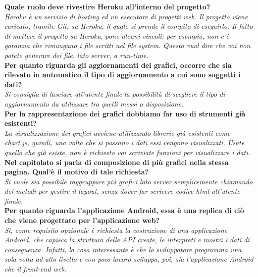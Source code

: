 	\textbf{Quale ruolo deve rivestire Heroku all'interno del progetto?}\\
	\textit{Heroku è un servizio di hosting ed un esecutore di progetti web. Il progetto viene caricato, tramite Git, su Heroku, il quale si prende il compito di eseguirlo. Il fatto di mettere il progetto su Heroku, pone alcuni vincoli: per esempio, non c'è garanzia che rimangano i file scritti nel file system. Questo vuol dire che voi non potete generare dei file, lato server, a run-time.}\\
	
	\textbf{Per quanto riguarda gli aggiornamenti dei grafici, occorre che sia rilevato in automatico il tipo di aggiornamento a cui sono soggetti i dati?}\\
	\textit{Si consiglia di lasciare all'utente finale la possibilità di scegliere il tipo di aggiornamento da utilizzare tra quelli messi a disposizione.}\\
	
	\textbf{Per la rappresentazione dei grafici dobbiamo far uso di strumenti già esistenti?}\\
	\textit{La visualizzazione dei grafici avviene utilizzando librerie già esistenti come chart.js, quindi, una volta che si passano i dati essi vengono visualizzati. Usate quello che già esiste, non è richiesto voi scriviate funzioni per visualizzare i dati.}\\
	
	\textbf{Nel capitolato si parla di composizione di più grafici nella stessa pagina. Qual'è il motivo di tale richiesta?}\\
	\textit{Si vuole sia possibile raggruppare più grafici lato server semplicemente chiamando dei metodi per gestire il layout, senza dover far scrivere codice html all'utente finale.}\\
	
	\textbf{Per quanto riguarda l'applicazione Android, essa è una replica di ciò che viene progettato per l'applicazione web?}\\
	\textit{Si, come requisito opzionale è richiesta la costruzione di una applicazione Android, che capisca la struttura delle API create, le interpreti e mostri i dati di conseguenza. Infatti, la cosa interessante è che lo sviluppatore programma una sola volta ad alto livello e con poco lavoro sviluppa, poi, sia l'applicazione Android che il front-end web.}\\
